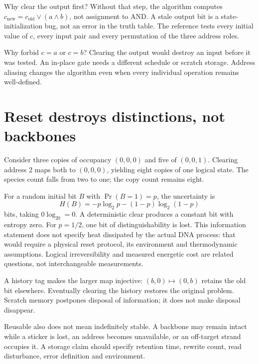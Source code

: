 Why clear the output first? Without that step, the algorithm computes
$c_{\mathrm{new}}=c_{\mathrm{old}}\lor(a\land b)$, not assignment to AND.
A stale output bit is a state-initialization bug, not an error in the truth
table. The reference tests every initial value of $c$, every input pair
and every permutation of the three address roles.

Why forbid $c=a$ or $c=b$? Clearing the output would destroy an input
before it was tested. An in-place gate needs a different schedule or
scratch storage. Address aliasing changes the algorithm even when every
individual operation remains well-defined.

\section{Reset destroys distinctions, not backbones}
Consider three copies of occupancy $(0,0,0)$ and five of $(0,0,1)$.
Clearing address 2 maps both to $(0,0,0)$, yielding eight copies of one
logical state. The species count falls from two to one; the copy count
remains eight.


For a random initial bit $B$ with $\Pr(B=1)=p$, the uncertainty is
\begin{equation}
 H(B)=-p\log_2p-(1-p)\log_2(1-p)
\end{equation}
bits, taking $0\log_20=0$. A deterministic clear produces a constant bit
with entropy zero. For $p=1/2$, one bit of distinguishability is lost.
This information statement does not specify heat dissipated by the actual
DNA process: that would require a physical reset protocol, its environment
and thermodynamic assumptions. Logical irreversibility and measured
energetic cost are related questions, not interchangeable measurements.

A history tag makes the larger map injective: $(b,0)\mapsto(0,b)$ retains
the old bit elsewhere. Eventually clearing the history restores the
original problem. Scratch memory postpones disposal of information; it
does not make disposal disappear.

Reusable also does not mean indefinitely stable. A backbone may remain
intact while a sticker is lost, an address becomes unavailable, or an
off-target strand occupies it. A storage claim should specify retention
time, rewrite count, read disturbance, error definition and environment.

